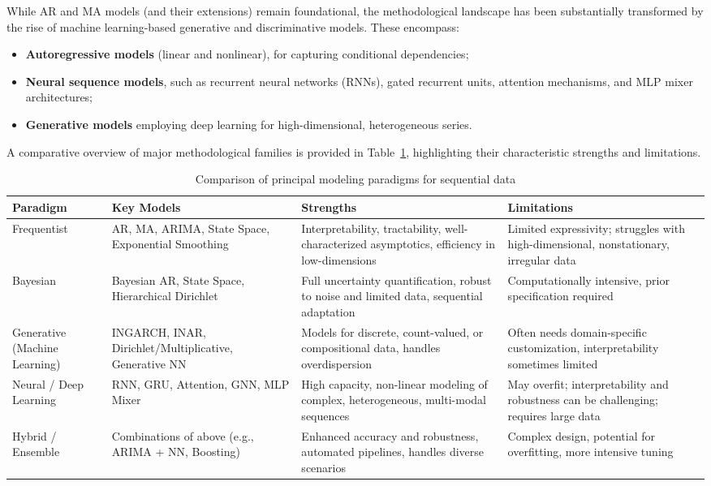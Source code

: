 \documentclass[11pt]{article}
\begin{document}
While AR and MA models (and their extensions) remain foundational, the methodological landscape has been substantially transformed by the rise of machine learning-based generative and discriminative models. These encompass:
\begin{itemize}
    \item \textbf{Autoregressive models} (linear and nonlinear), for capturing conditional dependencies;
    \item \textbf{Neural sequence models}, such as recurrent neural networks (RNNs), gated recurrent units, attention mechanisms, and MLP mixer architectures;
    \item \textbf{Generative models} employing deep learning for high-dimensional, heterogeneous series.
\end{itemize}

A comparative overview of major methodological families is provided in Table~\ref{tab:method_summary}, highlighting their characteristic strengths and limitations.

\begin{table}[ht]
    \centering
    \caption{Comparison of principal modeling paradigms for sequential data}
    \label{tab:method_summary}
    \begin{tabular}{|l|p{4cm}|p{3.7cm}|p{3.7cm}|}
        \hline
        \textbf{Paradigm} & \textbf{Key Models} & \textbf{Strengths} & \textbf{Limitations} \\
        \hline
        Frequentist & AR, MA, ARIMA, State Space, Exponential Smoothing & Interpretability, tractability, well-characterized asymptotics, efficiency in low-dimensions & Limited expressivity; struggles with high-dimensional, nonstationary, irregular data \\
        \hline
        Bayesian & Bayesian AR, State Space, Hierarchical Dirichlet & Full uncertainty quantification, robust to noise and limited data, sequential adaptation & Computationally intensive, prior specification required \\
        \hline
        Generative (Machine Learning) & INGARCH, INAR, Dirichlet/Multiplicative, Generative NN & Models for discrete, count-valued, or compositional data, handles overdispersion & Often needs domain-specific customization, interpretability sometimes limited \\
        \hline
        Neural / Deep Learning & RNN, GRU, Attention, GNN, MLP Mixer & High capacity, non-linear modeling of complex, heterogeneous, multi-modal sequences & May overfit; interpretability and robustness can be challenging; requires large data \\
        \hline
        Hybrid / Ensemble & Combinations of above (e.g., ARIMA + NN, Boosting) & Enhanced accuracy and robustness, automated pipelines, handles diverse scenarios & Complex design, potential for overfitting, more intensive tuning \\
        \hline
    \end{tabular}
\end{table}
\end{document}
